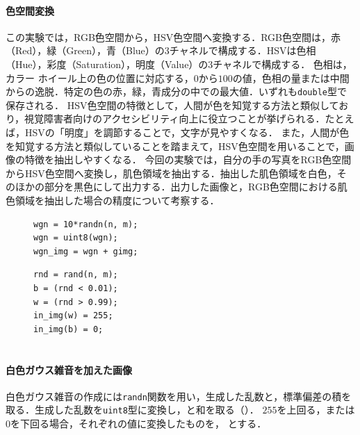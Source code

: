 \paragraph{色空間変換}この実験では，RGB色空間から，HSV色空間へ変換する．RGB色空間は，赤（Red），緑（Green），青（Blue）の3チャネルで構成する．HSVは色相（Hue），彩度（Saturation），明度（Value）の3チャネルで構成する．
色相は，カラー ホイール上の色の位置に対応する，\(0\)から\(100\)の値，色相の量または中間からの逸脱．特定の色の赤，緑，青成分の中での最大値．いずれも\texttt{double}型で保存される\cite{rgb2hsv}．
HSV色空間の特徴として，人間が色を知覚する方法と類似しており，視覚障害者向けのアクセシビリティ向上に役立つことが挙げられる．たとえば，HSVの「明度」を調節することで，文字が見やすくなる\cite[p.97\ -\ p.98]{画像処理}．
また，人間が色を知覚する方法と類似していることを踏まえて，HSV色空間を用いることで，画像の特徴を抽出しやすくなる．
今回の実験では，自分の手の写真をRGB色空間からHSV色空間へ変換し，肌色領域を抽出する．抽出した肌色領域を白色，そのほかの部分を黒色にして出力する．出力した画像と，RGB色空間における肌色領域を抽出した場合の精度について考察する．

\begin{figure}
    \vspace{-.5cm}
    \begin{lstlisting}[caption={白色ガウス雑音画像の生成},label={src:白色ガウス雑音画像の生成}]
% 画像サイズ : n x m
wgn = 10*randn(n, m);
wgn = uint8(wgn);
wgn_img = wgn + gimg;
    \end{lstlisting}
    \begin{lstlisting}[caption={インパルス雑音画像の生成},label={src:インパルス雑音画像の生成}]
% 画像サイズ : n x m
rnd = rand(n, m);
b = (rnd < 0.01);
w = (rnd > 0.99);
in_img(w) = 255;
in_img(b) = 0;
    \end{lstlisting}
    \vspace{-1cm}
\end{figure}
\section{\method}
\paragraph{白色ガウス雑音を加えた画像}
白色ガウス雑音の作成には\texttt{randn}関数を用い，生成した乱数と，標準偏差の積を取る．生成した乱数を\texttt{uint8}型に変換し，\originimg と和を取る（）．
\(255\)を上回る，または\(0\)を下回る場合，それぞれの値に変換したものを， \wgnimg とする．
